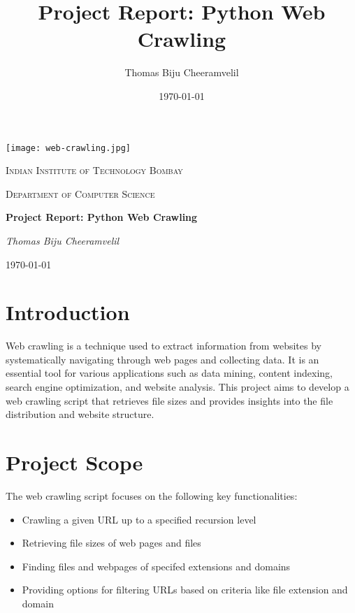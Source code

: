 \documentclass{article}
\title{Project Report: Python Web Crawling}
\author{Thomas Biju Cheeramvelil}
\date{\today}
\begin{document}
\begin{titlepage}
    \centering
    \vspace*{1cm}
    \texttt{[image: web-crawling.jpg]}\par\vspace{1cm}
    {\scshape\LARGE Indian Institute of Technology Bombay \par}
    \vspace{1cm}
    {\scshape\Large Department of Computer Science\par}
    \vspace{1.5cm}
    {\huge\bfseries Project Report: Python Web Crawling\par}
    \vspace{2cm}
    {\Large\itshape Thomas Biju Cheeramvelil\par}

    {\large \today\par}
\end{titlepage}

\tableofcontents
\newpage

\section{Introduction}
Web crawling is a technique used to extract information from websites by systematically navigating through web pages and collecting data. It is an essential tool for various applications such as data mining, content indexing, search engine optimization, and website analysis. This project aims to develop a web crawling script that retrieves file sizes and provides insights into the file distribution and website structure.

\section{Project Scope}
The web crawling script focuses on the following key functionalities:
\begin{itemize}
    \item Crawling a given URL up to a specified recursion level
    \item Retrieving file sizes of web pages and files
    \item Finding files and webpages of specifed extensions and domains
    \item Providing options for filtering URLs based on criteria like file extension and domain
\end{itemize}
\end{document}
